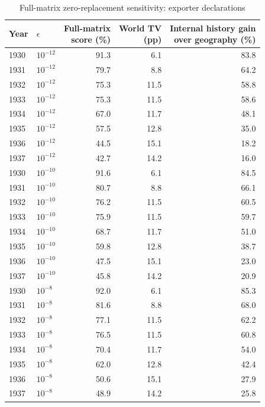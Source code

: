 \begin{table}[!htbp]\centering
\caption{Full-matrix zero-replacement sensitivity: exporter declarations}\label{tab:app_smoothing_export}
\begin{threeparttable}\small\setlength{\tabcolsep}{4pt}
\begin{tabular}{@{}llrrr@{}}
\toprule
Year & $\epsilon$ & \shortstack{Full-matrix\\score (\%)} & \shortstack{World TV\\(pp)} & \shortstack{Internal history gain\\over geography (\%)} \\
\midrule
1930 & $10^{-12}$ & 91.3 & 6.1 & 83.8 \\
1931 & $10^{-12}$ & 79.7 & 8.8 & 64.2 \\
1932 & $10^{-12}$ & 75.3 & 11.5 & 58.8 \\
1933 & $10^{-12}$ & 75.3 & 11.5 & 58.6 \\
1934 & $10^{-12}$ & 67.0 & 11.7 & 48.1 \\
1935 & $10^{-12}$ & 57.5 & 12.8 & 35.0 \\
1936 & $10^{-12}$ & 44.5 & 15.1 & 18.2 \\
1937 & $10^{-12}$ & 42.7 & 14.2 & 16.0 \\
1930 & $10^{-10}$ & 91.6 & 6.1 & 84.5 \\
1931 & $10^{-10}$ & 80.7 & 8.8 & 66.1 \\
1932 & $10^{-10}$ & 76.2 & 11.5 & 60.5 \\
1933 & $10^{-10}$ & 75.9 & 11.5 & 59.7 \\
1934 & $10^{-10}$ & 68.7 & 11.7 & 51.0 \\
1935 & $10^{-10}$ & 59.8 & 12.8 & 38.7 \\
1936 & $10^{-10}$ & 47.5 & 15.1 & 23.0 \\
1937 & $10^{-10}$ & 45.8 & 14.2 & 20.9 \\
1930 & $10^{-8}$ & 92.0 & 6.1 & 85.3 \\
1931 & $10^{-8}$ & 81.6 & 8.8 & 68.0 \\
1932 & $10^{-8}$ & 77.1 & 11.5 & 62.2 \\
1933 & $10^{-8}$ & 76.5 & 11.5 & 60.8 \\
1934 & $10^{-8}$ & 70.4 & 11.7 & 54.0 \\
1935 & $10^{-8}$ & 62.0 & 12.8 & 42.4 \\
1936 & $10^{-8}$ & 50.6 & 15.1 & 27.9 \\
1937 & $10^{-8}$ & 48.9 & 14.2 & 25.8 \\

\end{tabular}
\end{threeparttable}
\end{table}
